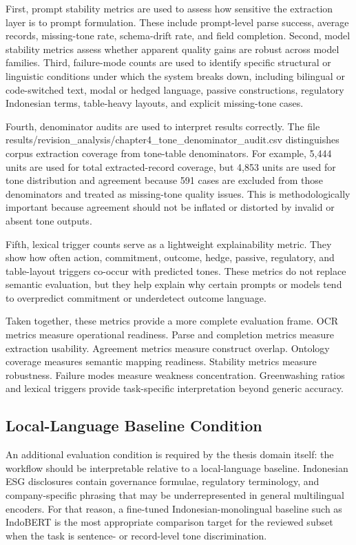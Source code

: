 First, prompt stability metrics are used to assess how sensitive the extraction layer is to prompt formulation. These include prompt-level parse success, average records, missing-tone rate, schema-drift rate, and field completion. Second, model stability metrics assess whether apparent quality gains are robust across model families. Third, failure-mode counts are used to identify specific structural or linguistic conditions under which the system breaks down, including bilingual or code-switched text, modal or hedged language, passive constructions, regulatory Indonesian terms, table-heavy layouts, and explicit missing-tone cases.

Fourth, denominator audits are used to interpret results correctly. The file results/revision\_analysis/chapter4\_tone\_denominator\_audit.csv distinguishes corpus extraction coverage from tone-table denominators. For example, 5,444 units are used for total extracted-record coverage, but 4,853 units are used for tone distribution and agreement because 591 cases are excluded from those denominators and treated as missing-tone quality issues. This is methodologically important because agreement should not be inflated or distorted by invalid or absent tone outputs.

Fifth, lexical trigger counts serve as a lightweight explainability metric. They show how often action, commitment, outcome, hedge, passive, regulatory, and table-layout triggers co-occur with predicted tones. These metrics do not replace semantic evaluation, but they help explain why certain prompts or models tend to overpredict commitment or underdetect outcome language.

Taken together, these metrics provide a more complete evaluation frame. OCR metrics measure operational readiness. Parse and completion metrics measure extraction usability. Agreement metrics measure construct overlap. Ontology coverage measures semantic mapping readiness. Stability metrics measure robustness. Failure modes measure weakness concentration. Greenwashing ratios and lexical triggers provide task-specific interpretation beyond generic accuracy.

\subsection{Local-Language Baseline Condition}

An additional evaluation condition is required by the thesis domain itself: the workflow should be interpretable relative to a local-language baseline. Indonesian ESG disclosures contain governance formulae, regulatory terminology, and company-specific phrasing that may be underrepresented in general multilingual encoders. For that reason, a fine-tuned Indonesian-monolingual baseline such as IndoBERT is the most appropriate comparison target for the reviewed subset when the task is sentence- or record-level tone discrimination.

